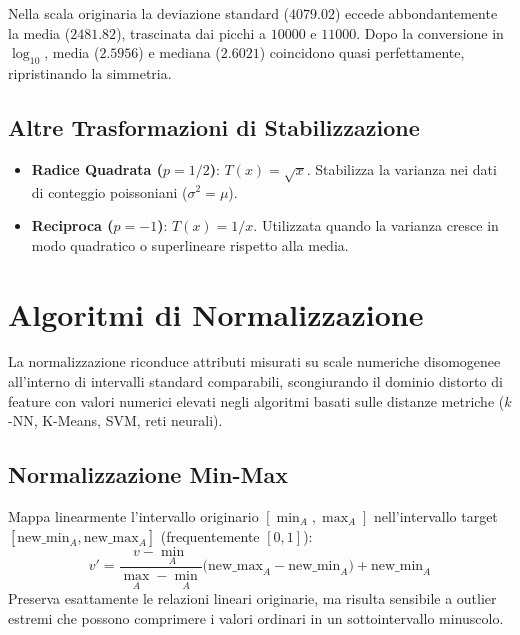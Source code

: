 Nella scala originaria la deviazione standard ($4079.02$) eccede abbondantemente la media ($2481.82$), trascinata dai picchi a $10000$ e $11000$. Dopo la conversione in $\log_{10}$, media ($2.5956$) e mediana ($2.6021$) coincidono quasi perfettamente, ripristinando la simmetria.

\subsection{Altre Trasformazioni di Stabilizzazione}
\begin{itemize}[noitemsep]
    \item \textbf{Radice Quadrata ($p = 1/2$)}: $T(x) = \sqrt{x}$. Stabilizza la varianza nei dati di conteggio poissoniani ($\sigma^2 = \mu$).
    \item \textbf{Reciproca ($p = -1$)}: $T(x) = 1/x$. Utilizzata quando la varianza cresce in modo quadratico o superlineare rispetto alla media.
\end{itemize}

\section{Algoritmi di Normalizzazione}
\label{sec:dm-normalization-algorithms}

La normalizzazione riconduce attributi misurati su scale numeriche disomogenee all'interno di intervalli standard comparabili, scongiurando il dominio distorto di feature con valori numerici elevati negli algoritmi basati sulle distanze metriche ($k$-NN, K-Means, SVM, reti neurali).

\subsection{Normalizzazione Min-Max}
Mappa linearmente l'intervallo originario $[\min_A, \max_A]$ nell'intervallo target $[\text{new\_min}_A, \text{new\_max}_A]$ (frequentemente $[0, 1]$):
\begin{equation}
    v' = \frac{v - \min_A}{\max_A - \min_A} \big(\text{new\_max}_A - \text{new\_min}_A\big) + \text{new\_min}_A
\end{equation}
Preserva esattamente le relazioni lineari originarie, ma risulta sensibile a outlier estremi che possono comprimere i valori ordinari in un sottointervallo minuscolo.

